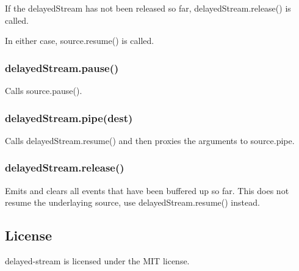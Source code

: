 If the {\ttfamily delayed\+Stream} has not been released so far, {\ttfamily delayed\+Stream.\+release()} is called.

In either case, {\ttfamily source.\+resume()} is called.

\subsubsection*{delayed\+Stream.\+pause()}

Calls {\ttfamily source.\+pause()}.

\subsubsection*{delayed\+Stream.\+pipe(dest)}

Calls {\ttfamily delayed\+Stream.\+resume()} and then proxies the arguments to {\ttfamily source.\+pipe}.

\subsubsection*{delayed\+Stream.\+release()}

Emits and clears all events that have been buffered up so far. This does not resume the underlaying source, use {\ttfamily delayed\+Stream.\+resume()} instead.

\subsection*{License}

delayed-\/stream is licensed under the M\+IT license. 